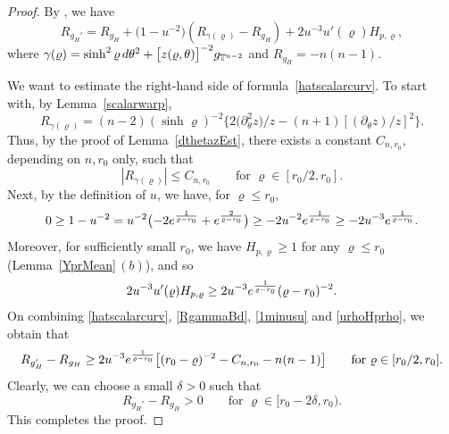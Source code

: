 \documentclass[11pt]{article}
\numberwithin{equation}{section}
\numberwithin{equation}{section}
\def\T{\mathbb{T}}
\def\ed{{\rm d}}
\begin{document}
\begin{proof}


By \cite[Claim 2.1]{SWW2022}, we have
\begin{equation}\label{hatscalarcurv}
R_{g_H'}=R_{g_H}+\bigl(1-u^{-2}\bigr)(R_{\gamma(\varrho)}-R_{g_H})+2u^{-3}u'(\varrho) H_{p,\varrho},
\end{equation}
where
${\gamma(\varrho)}= \sinh^2 \varrho \,\ed\theta^2 +\bigl[z(\varrho,\theta)\bigr]^{-2}g_{\T^{n-2}}$ and $R_{g_H} = -n(n-1)$.

We want to estimate the right-hand side of formula~\eqref{hatscalarcurv}. To start with, by Lemma~\ref{scalarwarp},
\begin{equation*}%
R_{\gamma(\varrho)}= (n-2) (\sinh \varrho )^{-2}
\big\{2\big(\partial_\theta^2 z\big)/z -(n+1)[(\partial_\theta z)/z]^2\big\}.
\end{equation*}
Thus, by the proof of Lemma~\ref{dthetazEst}, there exists a constant $C_{n,r_0}$,
depending on $n,r_0$ only, such that
\begin{equation}\label{RgammaBd}
|R_{\gamma(\varrho)}|\leq C_{n,r_0}\qquad\mbox{for } \varrho \in [r_0/2, r_0].
\end{equation}
Next, by the definition of $u$, we have, for $\varrho\le r_0$,
\begin{equation}\label{1minusu}
	0\ge 1 - u^{-2} = u^{-2}\bigl(-2 {\rm e}^{\frac{1}{\varrho - r_0}} + {\rm e}^{\frac{2}{\varrho - r_0}}\bigr) \ge - 2u^{-2} {\rm e}^{\frac{1}{\varrho - r_0}} \ge -2u^{-3} {\rm e}^{\frac{1}{\varrho - r_0}} .
\end{equation}
Moreover, for sufficiently small $r_0$, we have
$H_{p,\varrho} \geq 1$ for any $\varrho\le r_0$ (Lemma~\ref{YprMean}\,$(b)$), and so
\begin{equation}\label{urhoHprho}
	2u^{-3} u'(\varrho) H_{p,\varrho}  \ge 2u^{-3} {\rm e}^{\frac{1}{\varrho - r_0}}(\varrho - r_0)^{-2}.
\end{equation}
On combining \eqref{hatscalarcurv}, \eqref{RgammaBd}, \eqref{1minusu}
and \eqref{urhoHprho}, we obtain that
\begin{equation*}%
	R_{g_H'} - R_{g_H} \ge 2u^{-3} {\rm e}^{\frac{1}{\varrho - r_0}}
	\bigl[(r_0 - \varrho)^{-2} - C_{n,r_0} - n(n-1)\bigr]\qquad\mbox{for } \varrho\in [r_0/2, r_0].
\end{equation*}
Clearly, we can choose a small $\delta>0$ such that
\begin{equation*}%
 R_{g_H'} - R_{g_H} >0 \qquad \mbox{for }
 \varrho \in [r_0-2\delta, r_0).
\end{equation*}
This completes the proof.
\end{proof}
\end{document}
